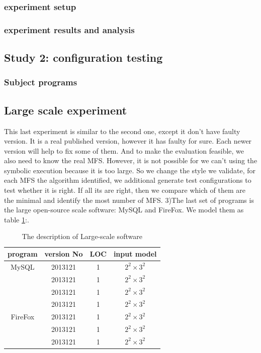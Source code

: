 \documentclass[10pt,journal,cspaper,compsoc]{IEEEtran}
\begin{document}
\subsubsection{experiment setup}



\subsubsection{experiment results and analysis}

\subsection{Study 2: configuration testing}
\subsubsection{Subject programs}
\subsection{Large scale experiment}
This last experiment is similar to the second one, except it don't have faulty version. It is a real published version, however it has faulty for sure. Each newer version will help to fix some of them. And to make the evaluation feasible, we also need to know the real MFS. However, it is not possible for we can't using the symbolic execution because it is too large. So we change the style we validate, for each MFS the algorithm identified, we additional generate test configurations to test whether it is right. If all its are right, then we compare which of them are the minimal and identify the most number of MFS.
3)The last set of programs is the large open-source scale software: MySQL and FireFox. We model them as table \ref{Large-Scale}:.
\begin{table}\renewcommand{\arraystretch}{1.3}
  \caption{The description of Large-scale software} \centering
  \label{Large-Scale}
  \begin{tabular}{c|c|c|c}\hline
  \hline
  \bfseries program & \bfseries version No  & \bfseries LOC  & \bfseries input model\\
  \hline
   MySQL & 2013121 & 1 & $2^{2}\times3^{2}$\\
     \ & 2013121 & 1 & $2^{2}\times3^{2}$\\
     \ & 2013121 & 1 & $2^{2}\times3^{2}$\\
     \ & 2013121 & 1 & $2^{2}\times3^{2}$\\
   FireFox & 2013121 & 1 &  $2^{2}\times3^{2}$\\
     \ & 2013121 & 1 & $2^{2}\times3^{2}$\\
     \ & 2013121 & 1 & $2^{2}\times3^{2}$\\
  \hline
  \end{tabular}

\end{table}
\end{document}
